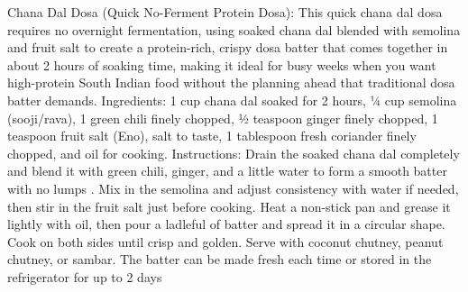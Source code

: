 Chana Dal Dosa (Quick No-Ferment Protein Dosa): This quick chana dal dosa requires no overnight fermentation, using soaked chana dal blended with semolina and fruit salt to create a protein-rich, crispy dosa batter that comes together in about 2 hours of soaking time, making it ideal for busy weeks when you want high-protein South Indian food without the planning ahead that traditional dosa batter demands. Ingredients: 1 cup chana dal soaked for 2 hours, ¼ cup semolina (sooji/rava), 1 green chili finely chopped, ½ teaspoon ginger finely chopped, 1 teaspoon fruit salt (Eno), salt to taste, 1 tablespoon fresh coriander finely chopped, and oil for cooking. Instructions: Drain the soaked chana dal completely and blend it with green chili, ginger, and a little water to form a smooth batter with no lumps . Mix in the semolina and adjust consistency with water if needed, then stir in the fruit salt just before cooking. Heat a non-stick pan and grease it lightly with oil, then pour a ladleful of batter and spread it in a circular shape. Cook on both sides until crisp and golden. Serve with coconut chutney, peanut chutney, or sambar. The batter can be made fresh each time or stored in the refrigerator for up to 2 days
\par

